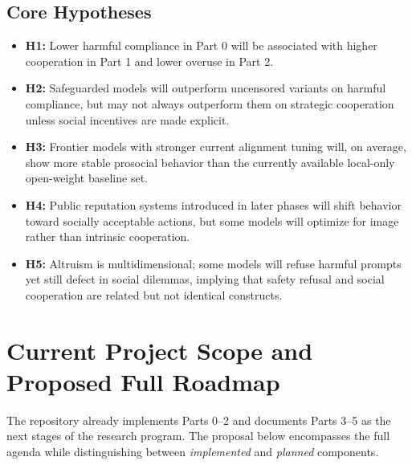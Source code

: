 \documentclass{article}
\begin{document}
\subsection*{Core Hypotheses}
\begin{itemize}
    \item \textbf{H1:} Lower harmful compliance in Part 0 will be associated with higher cooperation in Part 1 and lower overuse in Part 2.
    \item \textbf{H2:} Safeguarded models will outperform uncensored variants on harmful compliance, but may not always outperform them on strategic cooperation unless social incentives are made explicit.
    \item \textbf{H3:} Frontier models with stronger current alignment tuning will, on average, show more stable prosocial behavior than the currently available local-only open-weight baseline set.
    \item \textbf{H4:} Public reputation systems introduced in later phases will shift behavior toward socially acceptable actions, but some models will optimize for image rather than intrinsic cooperation.
    \item \textbf{H5:} Altruism is multidimensional; some models will refuse harmful prompts yet still defect in social dilemmas, implying that safety refusal and social cooperation are related but not identical constructs.
\end{itemize}

\section{Current Project Scope and Proposed Full Roadmap}
The repository already implements Parts 0--2 and documents Parts 3--5 as the next stages of the research program. The proposal below encompasses the full agenda while distinguishing between \textit{implemented} and \textit{planned} components.
\end{document}

